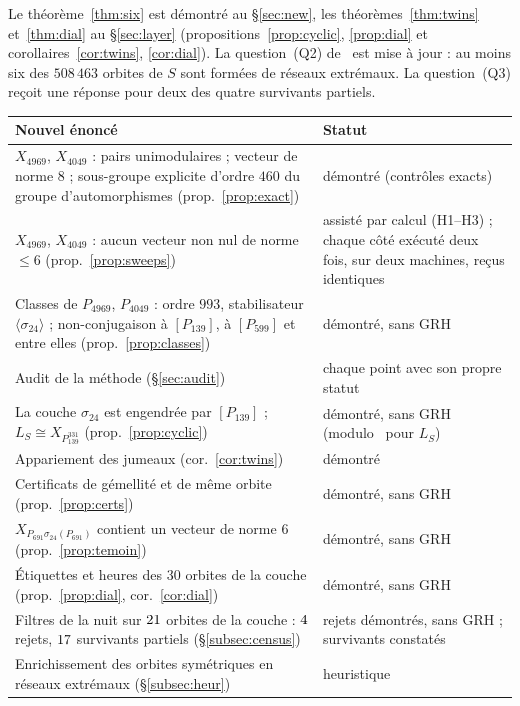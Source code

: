 \documentclass[11pt,a4paper]{amsart}
\theoremstyle{plain}
\theoremstyle{definition}
\newcommand{\LS}{L_{S}}
\begin{document}
Le théorème~\ref{thm:six} est démontré au \S\ref{sec:new}, les théorèmes~\ref{thm:twins} et~\ref{thm:dial} au \S\ref{sec:layer} (propositions~\ref{prop:cyclic}, \ref{prop:dial} et corollaires~\ref{cor:twins}, \ref{cor:dial}). La question~(Q2) de~\cite{Gau26} est mise à jour : au moins six des $508\,463$ orbites de $S$ sont formées de réseaux extrémaux. La question~(Q3) reçoit une réponse pour deux des quatre survivants partiels.

\begin{center}\small\renewcommand{\arraystretch}{1.2}
\begin{tabular}{>{\raggedright\arraybackslash}p{8.4cm}>{\raggedright\arraybackslash}p{6.2cm}}
\toprule
Nouvel énoncé & Statut \\
\midrule
$X_{4969}$, $X_{4049}$ : pairs unimodulaires ; vecteur de norme $8$ ; sous-groupe explicite d'ordre $460$ du groupe d'automorphismes (prop.~\ref{prop:exact}) & démontré (contrôles exacts) \\
$X_{4969}$, $X_{4049}$ : aucun vecteur non nul de norme $\le6$ (prop.~\ref{prop:sweeps}) & assisté par calcul (H1--H3) ; chaque côté exécuté deux fois, sur deux machines, reçus identiques \\
Classes de $P_{4969}$, $P_{4049}$ : ordre $993$, stabilisateur $\langle\sigma_{24}\rangle$ ; non-conjugaison à $[P_{139}]$, à $[P_{599}]$ et entre elles (prop.~\ref{prop:classes}) & démontré, sans GRH \\
Audit de la méthode (\S\ref{sec:audit}) & chaque point avec son propre statut \\
La couche $\sigma_{24}$ est engendrée par $[P_{139}]$ ; $\LS\cong X_{P_{139}^{331}}$ (prop.~\ref{prop:cyclic}) & démontré, sans GRH (modulo~\cite{Sak26} pour $\LS$) \\
Appariement des jumeaux (cor.~\ref{cor:twins}) & démontré \\
Certificats de gémellité et de même orbite (prop.~\ref{prop:certs}) & démontré, sans GRH \\
$X_{P_{691}\sigma_{24}(P_{691})}$ contient un vecteur de norme $6$ (prop.~\ref{prop:temoin}) & démontré, sans GRH \\
Étiquettes et heures des $30$ orbites de la couche (prop.~\ref{prop:dial}, cor.~\ref{cor:dial}) & démontré, sans GRH \\
Filtres de la nuit sur $21$ orbites de la couche : $4$ rejets, $17$ survivants partiels (\S\ref{subsec:census}) & rejets démontrés, sans GRH ; survivants constatés \\
Enrichissement des orbites symétriques en réseaux extrémaux (\S\ref{subsec:heur}) & heuristique \\
\bottomrule
\end{tabular}
\end{center}
\end{document}
